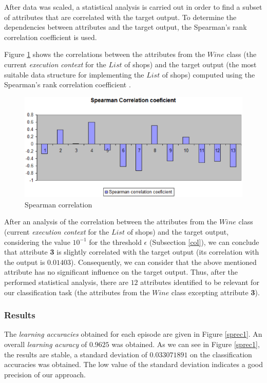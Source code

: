 After data was scaled, a statistical analysis is carried out in order to find a subset of attributes that are correlated with the target output. To determine the dependencies between attributes and the target output, the Spearman's rank correlation coefficient \cite{spearman} is used.   

Figure \ref{sper} shows the correlations between the attributes from the $Wine$ class (the current \emph{execution context} for the $List$ of shops) and the target output (the most suitable data structure for implementing the $List$ of shops) computed using the Spearman's rank correlation coefficient \cite{spearman}. 

\begin{figure}
   \centering
       \includegraphics[scale=0.28]{cor.eps}
              \caption{Spearman correlation}
 \label{sper}
\end{figure}

After an analysis of the correlation between the attributes from the $Wine$ class (current \emph{execution context} for the $List$ of shops) and the target output, considering the value $10^{-1}$ for the threshold $\epsilon$ (Subsection \ref{col}), we can conclude that attribute \textbf{3} is slightly correlated with the target output (its correlation with the output is $0.01403$). Consequently, we can consider that the above mentioned attribute has no significant influence on the target output. Thus, after the performed statistical analysis, there are $12$ attributes identified to be relevant for our classification task (the attributes from the $Wine$ class excepting attribute \textbf{3}). 

\subsubsection{Results}

The \emph{learning accuracies} obtained for each episode are given in Figure \ref{sprec1}. An overall \emph{learning acuracy} of $0.9625$ was obtained.
As we can see in Figure \ref{sprec1}, the results are stable, a standard deviation of $0.033071891$ on the classification accuracies was obtained. The low value of the standard deviation indicates a good precision of our approach.  
  
